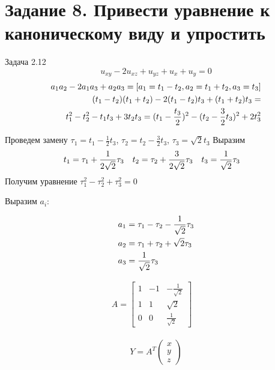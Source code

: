 \documentclass[a4paper,12pt]{article}
\begin{document}
\section{Задание 8. Привести уравнение к каноническому виду и упростить}
Задача 2.12
    $$u_{xy} - 2u_{xz} + u_{yz} + u_x + u_y = 0$$
    \begin{align}
        a_1a_2 - 2a_1a_3 + a_2a_3 = [a_1 = t_1 - t_2, a_2 = t_1 + t_2, a_3 = t_3] \notag \\
        (t_1 - t_2)(t_1 + t_2) - 2(t_1 - t_2)t_3 + (t_1 + t_2)t_3 = \notag \\
        t_1^2 - t_2^2 - t_1t_3 + 3t_2t_3 = (t_1 - \frac{t_3}{2})^2 - (t_2 - \frac{3}{2}t_3)^2 + 2t_3^2 \notag
    \end{align}
    
    Проведем замену $\tau_1 = t_1 - \frac{1}{2}t_3$, $\tau_2 = t_2 - \frac{3}{2}t_3$, $\tau_3 = \sqrt{2}t_3$
    Выразим 
    \begin{align}
        &t_1 = \tau_1 + \frac{1}{2\sqrt{2}}\tau_3& &t_2 = \tau_2 + \frac{3}{2\sqrt{2}}\tau_3& &t_3 = \frac{1}{\sqrt{2}}\tau_3& \notag
    \end{align}
    Получим уравнение $\tau_1^2 - \tau_2^2 + \tau_3^2 = 0$
    
    Выразим \(a_i\):

    \begin{align}
        a_1 &= \tau_1 - \tau_2 - \frac{1}{\sqrt{2}}\tau_3 \notag \\
        a_2 &= \tau_1 + \tau_2 + \sqrt{2}\tau_3 \notag \\
        a_3 &= \frac{1}{\sqrt{2}}\tau_3 \notag 
    \end{align}

    \begin{gather*}
        A = \begin{bmatrix}
            1 & -1 & -\frac{1}{\sqrt{2}} \\
            1 & 1 & \sqrt{2} \\
            0 & 0 & \frac{1}{\sqrt{2}}
        \end{bmatrix} \quad
    \end{gather*}

    \begin{gather*}
        Y = A^T \begin{pmatrix} x \\ y \\ z \end{pmatrix}
    \end{gather*}
\end{document}

